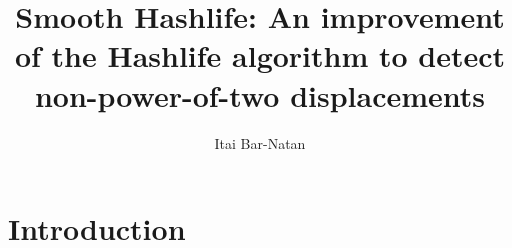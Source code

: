 \documentclass{article}
\begin{document}
\title{Smooth Hashlife: An improvement of the Hashlife algorithm to detect
non-power-of-two displacements}
\author{Itai Bar-Natan}
\maketitle

\section{Introduction}
\end{document}
